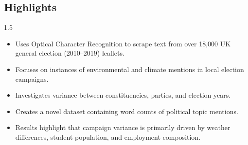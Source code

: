 \documentclass[preprint]{elsarticle}
\begin{document}
\begin{center}
    \section*{\LARGE\textbf{Highlights}}
\end{center}

\vspace{2em}
\begin{spacing}{1.5}
\begin{itemize}
    \item Uses Optical Character Recognition to scrape text from over 18,000 UK general election (2010–2019) leaflets.
    \item Focuses on instances of environmental and climate mentions in local election campaigns.
    \item Investigates variance between constituencies, parties, and election years.
    \item Creates a novel dataset containing word counts of political topic mentions.
    \item Results highlight that campaign variance is primarily driven by weather differences, student population, and employment composition.
\end{itemize}
\end{spacing}
\end{document}
